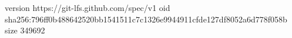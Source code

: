 version https://git-lfs.github.com/spec/v1
oid sha256:796ff0b488642520bb1541511c7c1326e9944911cfde127df8052a6d778f058b
size 349692

